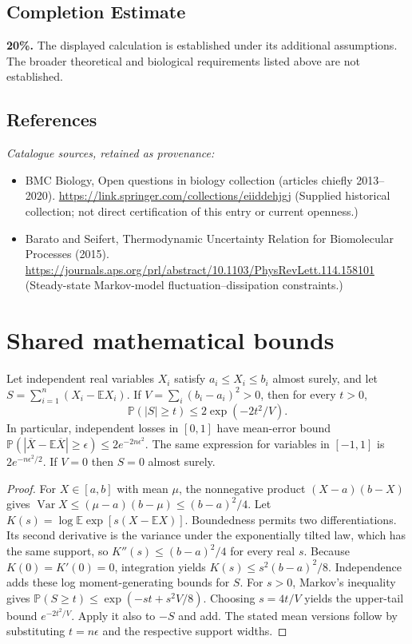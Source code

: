 \documentclass[11pt]{article}
\begin{document}
\subsection{Completion Estimate}
\textbf{20\%.} The displayed calculation is established under its additional assumptions. The broader theoretical and biological requirements listed above are not established.
\subsection{References}
\noindent\emph{Catalogue sources, retained as provenance:}
\begin{itemize}
\item BMC Biology, Open questions in biology collection (articles chiefly 2013--2020). \url{https://link.springer.com/collections/eiiddehjgj} (Supplied historical collection; not direct certification of this entry or current openness.)
\item Barato and Seifert, Thermodynamic Uncertainty Relation for Biomolecular Processes (2015). \url{https://journals.aps.org/prl/abstract/10.1103/PhysRevLett.114.158101} (Steady-state Markov-model fluctuation--dissipation constraints.)
\end{itemize}




\section{Shared mathematical bounds}\label{app:bounds}
\begin{lemma}\label{lem:bounded}
Let independent real variables $X_i$ satisfy $a_i\leq X_i\leq b_i$ almost surely,
and let $S=\sum_{i=1}^n(X_i-\mathbb{E} X_i)$. If
$V=\sum_i(b_i-a_i)^2>0$, then for every $t>0$,
\[
 \mathbb{P}(|S|\geq t)\leq 2\exp(-2t^2/V).
\]
In particular, independent losses in $[0,1]$ have mean-error bound
$\mathbb{P}(|\overline X-\mathbb{E}\overline X|\geq\epsilon)
\leq2e^{-2n\epsilon^2}$. The same expression for variables in $[-1,1]$
is $2e^{-n\epsilon^2/2}$. If $V=0$ then $S=0$ almost surely.
\end{lemma}
\begin{proof}
For $X\in[a,b]$ with mean $\mu$, the nonnegative product
$(X-a)(b-X)$ gives
$\operatorname{Var} X\leq(\mu-a)(b-\mu)\leq(b-a)^2/4$.
Let $K(s)=\log\mathbb{E}\exp[s(X-\mathbb{E} X)]$.
Boundedness permits two differentiations. Its second derivative is the variance
under the exponentially tilted law, which has the same support, so
$K''(s)\leq(b-a)^2/4$ for every real $s$.
Because $K(0)=K'(0)=0$, integration yields
$K(s)\leq s^2(b-a)^2/8$.
Independence adds these log moment-generating bounds for $S$.
For $s>0$, Markov's inequality gives
$\mathbb{P}(S\geq t)\leq\exp(-st+s^2V/8)$.
Choosing $s=4t/V$ yields the upper-tail bound $e^{-2t^2/V}$.
Apply it also to $-S$ and add. The stated mean versions follow by substituting
$t=n\epsilon$ and the respective support widths.
\end{proof}
\end{document}
